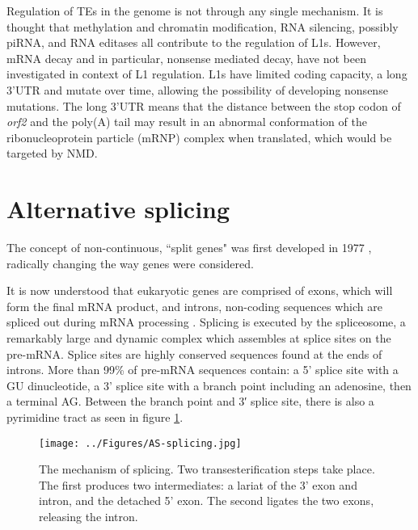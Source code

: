 \documentclass[12pt]{article}
\begin{document}
			Regulation of TEs in the genome is not through any single mechanism. %
			It is thought that methylation and chromatin modification, RNA silencing, possibly piRNA, and RNA editases all contribute to the regulation of L1s.
			However, mRNA decay and in particular, nonsense mediated decay, have not been investigated in context of L1 regulation.
			L1s have limited coding capacity, a long 3'UTR and mutate over time, allowing the possibility of developing nonsense mutations.
			The long 3'UTR means that the distance between the stop codon of \textit{orf2} and the poly(A) tail may result in an abnormal conformation of the ribonucleoprotein particle (mRNP) complex when translated, which would be targeted by NMD.

		
	\section{Alternative splicing}
		

		The concept of non-continuous, ``split genes" was first developed in 1977 \citep{Berget77}, radically changing the way genes were considered. 
			
		It is now understood that eukaryotic genes are comprised of exons, which will form the final mRNA product, and introns, non-coding sequences which are spliced out during mRNA processing \citep{Matlin05}.
		Splicing is executed by the spliceosome, a remarkably large and dynamic complex which assembles at splice sites on the pre-mRNA. 
		Splice sites are highly conserved sequences found at the ends of introns. More than 99\% of pre-mRNA sequences contain: a 5' splice site with a GU dinucleotide, a 3' splice site with a branch point including an adenosine, then a terminal AG.
		Between the branch point and 3′ splice site, there is also a pyrimidine tract \citep{Black03,Vanderfeltz12} as seen in figure \ref{fig:AS-splicing}. 

			\begin{figure}[b] %
				\centering
				\texttt{[image: ../Figures/AS-splicing.jpg]}
				\caption{The mechanism of splicing. Two transesterification steps take place.
				The first produces two intermediates: a lariat of the 3' exon and intron, and the detached 5' exon.
				The second ligates the two exons, releasing the intron. \citep[Figure sourced:][]{Black03}}
				\label{fig:AS-splicing}
			\end{figure}
		
\end{document}
